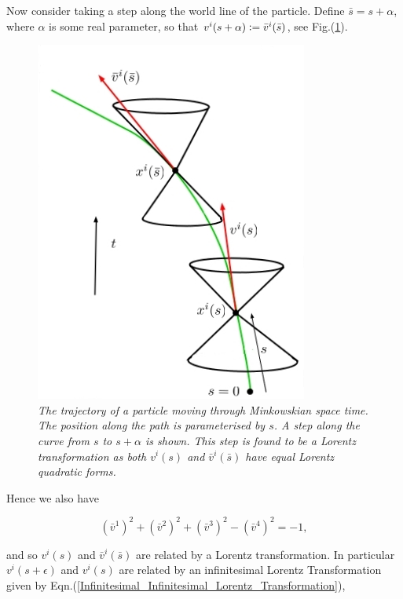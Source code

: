 Now consider taking a step along the world line of the particle. Define $\bar{s} = s + \alpha$, where $\alpha$ is some real parameter, so that $v^i (s+\alpha) \vcentcolon = \bar{v}^i(\bar{s})$, see Fig.(\ref{Infinitesimal_Fig_Steps_Along_Minkowskian}).

\begin{figure}[h!]
\begin{center}
\caption{\textit{The trajectory of a particle moving through Minkowskian space time. The position along the path is parameterised by $s$. A step along the curve from $s$ to $s+\alpha$ is shown. This step is found to be a Lorentz transformation as both $v^i(s)$ and $\bar{v}^i(\bar{s})$ have equal Lorentz quadratic forms.}}
\label{Infinitesimal_Fig_Steps_Along_Minkowskian}
\includegraphics[scale=0.8]{figs/5_4.jpg}
\end{center}
\end{figure}

Hence we also have

\begin{equation*}
({\bar{v}^1})^2  + ({\bar{v}^2})^2 + ({\bar{v}^3})^2  - ({\bar{v}^4})^2 = -1,
\end{equation*}

\noindent and so $v^i(s)$ and $\bar{v}^i(\bar{s})$ are related by a Lorentz transformation. In particular $v^i(s+\epsilon)$ and $v^i(s)$ are related by an infinitesimal Lorentz Transformation given by Eqn.(\ref{Infinitesimal_Infinitesimal_Lorentz_Transformation}),

